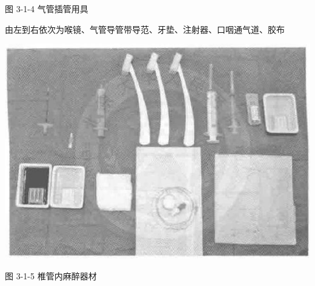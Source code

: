 \documentclass[10pt]{article}
\begin{document}
图 3-1-4 气管插管用具

由左到右依次为喉镜、气管导管带导范、牙垫、注射器、口咽通气道、胶布

\begin{center}
\includegraphics[max width=\textwidth]{2024_07_05_645bb794a4d4f32ee0c8g-072}
\end{center}

图 3-1-5 椎管内麻醉器材
\end{document}
